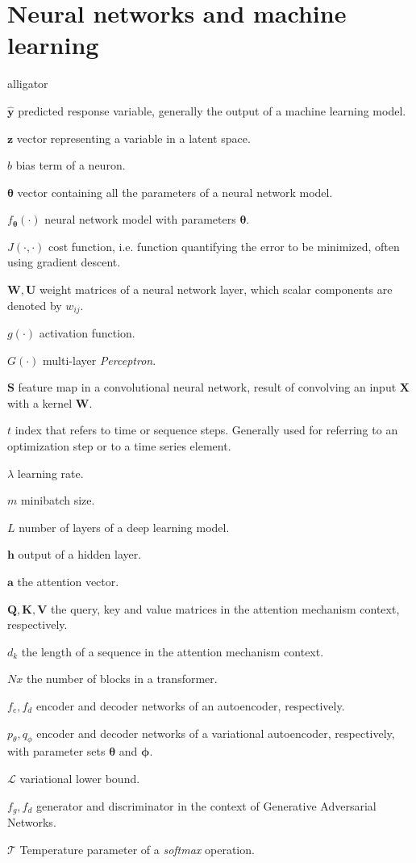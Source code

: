 \section*{Neural networks and machine learning}

\begin{labeling}{alligator}
	\item [$\mathbf{\hat{y}}$] predicted response variable, generally the output of a machine learning model.
	\item [$\mathbf{z}$] vector representing a variable in a latent space.
	\item [$b$] bias term of a neuron.
	\item [$\mathbf{\theta}$] vector containing all the parameters of a neural network model.
	\item [$f_\mathbf{\theta}(\cdot)$] neural network model with parameters $\mathbf{\theta}$.
	\item [$J(\cdot, \cdot)$] cost function, i.e. function quantifying the error to be minimized, often using gradient descent.
	\item [$\mathbf{W}, \mathbf{U}$] weight matrices of a neural network layer, which scalar components are denoted by $w_{ij}$.
	\item[$g(\cdot)$] activation function.
	\item[$G(\cdot)$] multi-layer \textit{Perceptron}.
	\item{$\mathbf{S}$} feature map in a convolutional neural network, result of convolving an input $\mathbf{X}$ with a kernel $\mathbf{W}$.
	\item[$t$] index that refers to time or sequence steps. Generally used for referring to  an optimization step or to a time series element.
	\item[$\lambda$] learning rate.
	\item[$m$] minibatch size.
	\item[$L$] number of layers of a deep learning model.
	\item[$\mathbf{h}$] output of a hidden layer.
	\item[$\mathbf{a}$] the attention vector.
	\item[$\mathbf{Q}, \mathbf{K}, \mathbf{V}$] the query, key and value matrices in the attention mechanism context, respectively.
	\item[$d_k$]{the length of a sequence in the attention mechanism context.}
	\item[$Nx$]{the number of blocks in a transformer.}
	\item[$f_e, f_d$]{encoder and decoder networks of an autoencoder, respectively.}
	\item[$p_\theta, q_\phi$]{encoder and decoder networks of a variational autoencoder, respectively, with parameter sets $\mathbf{\theta}$ and $\mathbf{\phi}$.}
	\item[$\mathcal{L}$]{variational lower bound.}
	\item[$f_g, f_d$]{generator and discriminator in the context of Generative Adversarial Networks.}
	\item[$\mathcal{T}$] Temperature parameter of a \textit{softmax} operation.
\end{labeling}

